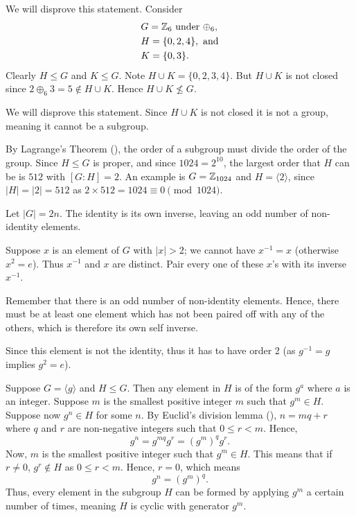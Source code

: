 \begin{questions}
\begin{partquestions}{\alph*}
        \item We will disprove this statement. Consider
        \begin{align*}
            &G = \mathbb{Z}_6 \text{ under }\oplus_6,\\
            &H = \{0, 2, 4\},\text{ and}\\
            &K = \{0, 3\}.
        \end{align*}
        Clearly $H \leq G$ and $K \leq G$. Note $H \cup K = \{0, 2, 3, 4\}$. But $H \cup K$ is not closed since $2 \oplus_6 3 = 5 \not \in H \cup K$. Hence $H \cup K \not\leq G$.

        \item We will disprove this statement. Since $H \cup K$ is not closed it is not a group, meaning it cannot be a subgroup.
    \end{partquestions}

    \item By Lagrange's Theorem (), the order of a subgroup must divide the order of the group. Since $H \leq G$ is proper, and since $1024 = 2^{10}$, the largest order that $H$ can be is $512$ with $[G:H] = 2$. An example is $G = \mathbb{Z}_{1024}$ and $H = \langle 2 \rangle$, since $|H| = |2| = 512$ as $2 \times 512 = 1024 \equiv 0 \pmod{1024}$.

    \item Let $|G| = 2n$. The identity is its own inverse, leaving an odd number of non-identity elements.

    Suppose $x$ is an element of $G$ with $|x| > 2$; we cannot have $x^{-1} = x$ (otherwise $x^2 = e$). Thus $x^{-1}$ and $x$ are distinct. Pair every one of these $x$'s with its inverse $x^{-1}$.

    Remember that there is an odd number of non-identity elements. Hence, there must be at least one element which has not been paired off with any of the others, which is therefore its own self inverse.

    Since this element is not the identity, thus it has to have order 2 (as $g^{-1} = g$ implies $g^2 = e$).

    \item Suppose $G = \langle g \rangle$ and $H \leq G$. Then any element in $H$ is of the form $g^a$ where $a$ is an integer. Suppose $m$ is the smallest positive integer $m$ such that $g^m \in H$. Suppose now $g^n \in H$ for some $n$. By Euclid's division lemma (), $n = mq + r$ where $q$ and $r$ are non-negative integers such that $0 \leq r < m$. Hence,
    \[
        g^n = g^{mq}g^r = (g^m)^q g^r.
    \]
    Now, $m$ is the smallest positive integer such that $g^m \in H$. This means that if $r \neq 0$, $g^r \not\in H$ as $0 \leq r < m$. Hence, $r = 0$, which means
    \[
        g^n = (g^m)^q.
    \]
    Thus, every element in the subgroup $H$ can be formed by applying $g^m$ a certain number of times, meaning $H$ is cyclic with generator $g^m$.


\end{questions}
